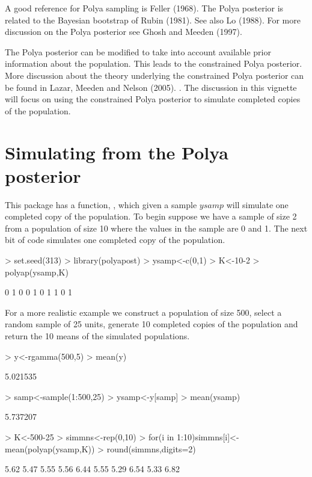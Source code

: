 \documentclass{article}
\begin{document}
 A good reference for  Polya
sampling is Feller (1968). \nocite{fel68} The Polya posterior is
related to the Bayesian bootstrap of Rubin (1981). \nocite{rub81}
See also Lo (1988). \nocite{lo88} For more discussion on the Polya 
posterior see Ghosh and Meeden (1997). \nocite{ghomee97}

The Polya posterior can be modified to take into account  
available prior information about the population. This leads to 
the constrained Polya posterior. More discussion about the theory
underlying the constrained Polya posterior can be found in 
 Lazar, Meeden and Nelson (2005). \nocite{l-m-n05}. The discussion 
in this vignette will focus on using the constrained Polya 
posterior to simulate completed copies of the population. 

\section{Simulating from the Polya posterior}

This package has a function, \verb@polyap@,  which given a sample $ysamp$ will 
simulate one completed copy of the population. 
To begin suppose we have a sample of size 2 from a population of 
size 10 where the  values in the sample are 0 and 1.
The next bit of code simulates one completed copy of the population.

\begin{Schunk}
\begin{Sinput}
> set.seed(313)
> library(polyapost)
> ysamp<-c(0,1)
> K<-10-2
> polyap(ysamp,K)
\end{Sinput}
\begin{Soutput}
 [1] 0 1 0 0 1 0 1 1 0 1
\end{Soutput}
\end{Schunk}

For a more realistic example 
we construct a population of size 500,  select a 
random sample of 25 units,  generate 10 completed copies of 
the population and return the 10 means of the simulated populations.  

\begin{Schunk}
\begin{Sinput}
> y<-rgamma(500,5)
> mean(y)
\end{Sinput}
\begin{Soutput}
[1] 5.021535
\end{Soutput}
\begin{Sinput}
> samp<-sample(1:500,25)
> ysamp<-y[samp]
> mean(ysamp)
\end{Sinput}
\begin{Soutput}
[1] 5.737207
\end{Soutput}
\begin{Sinput}
> K<-500-25
> simmns<-rep(0,10)
> for(i in 1:10){simmns[i]<-mean(polyap(ysamp,K))}
> round(simmns,digits=2)
\end{Sinput}
\begin{Soutput}
 [1] 5.62 5.47 5.55 5.56 6.44 5.55 5.29 6.54 5.33 6.82
\end{Soutput}
\end{Schunk}
\end{document}
